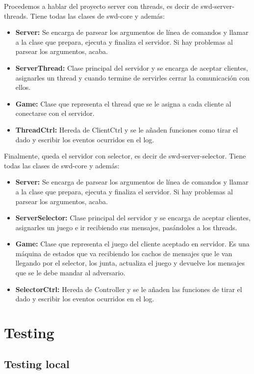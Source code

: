Procedemos a hablar del proyecto server con threads, es decir de swd-server-threads. Tiene todas las clases de swd-core y además:
\begin{itemize}
\item \textbf{Server:} Se encarga de parsear los argumentos de línea de comandos y llamar a la clase que prepara, ejecuta y finaliza el servidor. Si hay problemas al parsear los argumentos, acaba.
\item \textbf{ServerThread:} Clase principal del servidor y se encarga de aceptar clientes, asignarles un thread y cuando termine de servirles cerrar la comunicación con ellos.
\item \textbf{Game:} Clase que representa el thread que se le asigna a cada cliente al conectarse con el servidor.
\item \textbf{ThreadCtrl:} Hereda de ClientCtrl y se le añaden funciones como tirar el dado y escribir los eventos ocurridos en el log.
\end{itemize}

Finalmente, queda el servidor con selector, es decir de swd-server-selector. Tiene todas las clases de swd-core y además:
\begin{itemize}
\item \textbf{Server:} Se encarga de parsear los argumentos de línea de comandos y llamar a la clase que prepara, ejecuta y finaliza el servidor. Si hay problemas al parsear los argumentos, acaba.
\item \textbf{ServerSelector:} Clase principal del servidor y se encarga de aceptar clientes, asignarles un juego e ir recibiendo sus mensajes, pasándoles a los threads.
\item \textbf{Game:} Clase que representa el juego del cliente aceptado en servidor. Es una máquina de estados que va recibiendo los cachos de mensajes que le van llegando por el selector, los junta, actualiza el juego y devuelve los mensajes que se le debe mandar al adversario.
\item \textbf{SelectorCtrl:} Hereda de Controller y se le añaden las funciones de tirar el dado y escribir los eventos ocurridos en el log.
\end{itemize}

\newpage
\section*{Testing}
\subsection*{Testing local}



